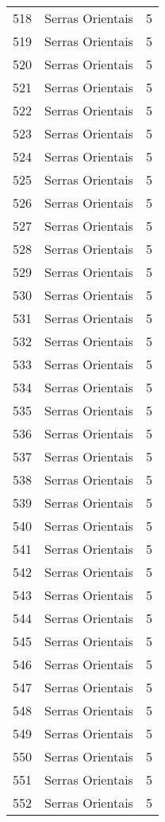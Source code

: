 \begin{table}[p]
\begin{tabular}{rlr}
  518 & Serras Orientais &   5 \\ 
  519 & Serras Orientais &   5 \\ 
  520 & Serras Orientais &   5 \\ 
  521 & Serras Orientais &   5 \\ 
  522 & Serras Orientais &   5 \\ 
  523 & Serras Orientais &   5 \\ 
  524 & Serras Orientais &   5 \\ 
  525 & Serras Orientais &   5 \\ 
  526 & Serras Orientais &   5 \\ 
  527 & Serras Orientais &   5 \\ 
  528 & Serras Orientais &   5 \\ 
  529 & Serras Orientais &   5 \\ 
  530 & Serras Orientais &   5 \\ 
  531 & Serras Orientais &   5 \\ 
  532 & Serras Orientais &   5 \\ 
  533 & Serras Orientais &   5 \\ 
  534 & Serras Orientais &   5 \\ 
  535 & Serras Orientais &   5 \\ 
  536 & Serras Orientais &   5 \\ 
  537 & Serras Orientais &   5 \\ 
  538 & Serras Orientais &   5 \\ 
  539 & Serras Orientais &   5 \\ 
  540 & Serras Orientais &   5 \\ 
  541 & Serras Orientais &   5 \\ 
  542 & Serras Orientais &   5 \\ 
  543 & Serras Orientais &   5 \\ 
  544 & Serras Orientais &   5 \\ 
  545 & Serras Orientais &   5 \\ 
  546 & Serras Orientais &   5 \\ 
  547 & Serras Orientais &   5 \\ 
  548 & Serras Orientais &   5 \\ 
  549 & Serras Orientais &   5 \\ 
  550 & Serras Orientais &   5 \\ 
  551 & Serras Orientais &   5 \\ 
  552 & Serras Orientais &   5 \\ 

\end{tabular}
\end{table}

